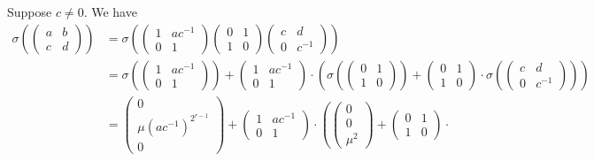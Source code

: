 Suppose $c\neq0$. We have
\begin{align*}
\sigma\left(\left(\begin{matrix} a & b \\ c & d \end{matrix}\right)\right) 
&=
\sigma\left(
	\left(\begin{matrix} 1 & ac^{-1} \\ 0 & 1 \end{matrix}\right)
	\left(\begin{matrix} 0 & 1 \\ 1 & 0 \end{matrix}\right)
	\left(\begin{matrix} c & d \\ 0 & c^{-1} \end{matrix}\right)
\right) \\
&=
\sigma\left(
	\left(\begin{matrix} 1 & ac^{-1} \\ 0 & 1 \end{matrix}\right)
\right) +
\left(\begin{matrix} 1 & ac^{-1} \\ 0 & 1 \end{matrix}\right) \cdot
\left(
	\sigma\left(
		\left(\begin{matrix} 0 & 1 \\ 1 & 0 \end{matrix}\right)
	\right) +
	\left(\begin{matrix} 0 & 1 \\ 1 & 0 \end{matrix}\right) \cdot
	\sigma\left(
		\left(\begin{matrix} c & d \\ 0 & c^{-1} \end{matrix}\right)
	\right)
\right) \\
&=
\left(\begin{matrix} 0 \\ \mu(ac^{-1})^{2^{r-1}} \\ 0 \end{matrix}\right)
+
\left(\begin{matrix} 1 & ac^{-1} \\ 0 & 1 \end{matrix}\right) \cdot
\left(
	\left(\begin{matrix} 0 \\ 0 \\ \mu^2 \end{matrix}\right)
	+
	\left(\begin{matrix} 0 & 1 \\ 1 & 0 \end{matrix}\right) \cdot

\end{align*}
